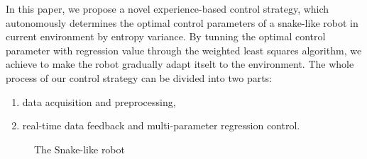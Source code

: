 In this paper, we propose a novel experience-based control strategy,
which autonomously determines the optimal control parameters of a snake-like robot in
current environment by entropy variance\cite{WaveformEntropyVariance}\cite{EntropyandVarianceasRiskMeasure}\cite{UsingEntropyAndVariance}. By tunning the optimal control parameter with regression value through the weighted least squares algorithm\cite{gradientMethod}\cite{MSEestimates}, we achieve to make the robot gradually adapt itselt to the environment. The whole process of our control strategy can be divided into two parts:
\begin{enumerate}
	\item data acquisition and preprocessing,
	\item real-time data feedback and multi-parameter regression control.
\end{enumerate}
\begin{figure}[!t]
	\centering
	\caption{The Snake-like robot}
\end{figure}
